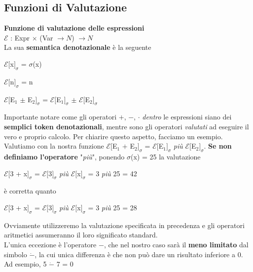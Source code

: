 \documentclass[10pt]{book}
\begin{document}
\subsection{Funzioni di Valutazione}
\begin{list}{}{Inoltre, per valutare le espressioni generate dalla grammatica, servono delle \textbf{funzioni di valutazione}. Esse \textbf{trovano il significato di ogni espressione}}
	\item \textbf{Funzione di valutazione delle espressioni}\\$\mathscr{E}$ : Expr $\times$ (Var $\rightarrow N$) $\rightarrow N$\\La sua \textbf{semantica denotazionale} è la seguente
	\begin{multicols}{2}
	\begin{list}{}{}
		\item $\mathscr{E}[$x$]_\sigma$ = $\sigma$(x)
		\item $\mathscr{E}[$n$]_\sigma$ = n
		\item $\mathscr{E}[$E$_1$ $\pm$ E$_2]_\sigma$ = $\mathscr{E}[$E$_1]_\sigma$ $\pm$ $\mathscr{E}[$E$_2]_\sigma$
	\end{list}
	\end{multicols}
	Importante notare come gli operatori $+$, $-$, $\cdot$ \textit{dentro} le espressioni siano dei \textbf{semplici token denotazionali}, mentre sono gli operatori \textit{valutati} ad eseguire il vero e proprio calcolo. Per chiarire questo aspetto, facciamo un esempio. Valutiamo con la nostra funzione $\mathscr{E}[$E$_1$ $+$ E$_2]_\sigma$ = $\mathscr{E}[$E$_1]_\sigma$ \textit{più} $\mathscr{E}[$E$_2]_\sigma$. \textbf{Se non definiamo l'operatore} "\textit{più}", ponendo $\sigma$(x) = 25 la valutazione
	\begin{list}{}{}
		\item $\mathscr{E}[$3 + x$]_\sigma$ = $\mathscr{E}[$3$]_\sigma$ \textit{più} $\mathscr{E}[$x$]_\sigma$ = 3 \textit{più} 25 = 42
	\end{list}
	è corretta quanto
	\begin{list}{}{}
		\item $\mathscr{E}[$3 + x$]_\sigma$ = $\mathscr{E}[$3$]_\sigma$ \textit{più} $\mathscr{E}[$x$]_\sigma$ = 3 \textit{più} 25 = 28
	\end{list}
	Ovviamente utilizzeremo la valutazione specificata in precedenza e gli operatori aritmetici assumeranno il loro significato standard.\\
	L'unica eccezione è l'operatore $-$, che nel nostro caso sarà il \textbf{meno limitato} dal simbolo $\dot{-}$, la cui unica differenza è che non può dare un risultato inferiore a 0. Ad esempio, 5 $\dot{-}$ 7 = 0

\end{list}
\end{document}

